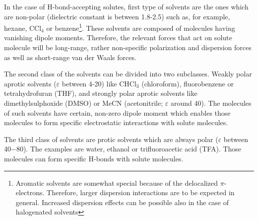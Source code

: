\documentclass[a4paper,titlepage,twoside,fleqn,12pt]{book}
\begin{document}
\begin{refsection}
In the case of H\hyp{}bond\hyp{}accepting solutes, first type of solvents are the ones
which are non\hyp{}polar (dielectric constant is between 1.8-2.5) such as, for example,
hexane, CCl$_4$ or benzene\footnote{Aromatic solvents are somewhat special because 
of the delocalized $\pi$-electrons. Therefore, larger dispersion interactions are to be expected in general.
Increased dispersion effects can be possible also in the case of halogenated solvents}. 
These solvents are composed
of molecules having vanishing dipole moments. Therefore, the relevant forces that act on
solute molecule will be long\hyp{}range, rather non\hyp{}specific polarization and dispersion
forces as well as short\hyp{}range van der Waals forces. 

The second class of the solvents can be divided into two subclasses. 
Weakly polar aprotic solvents ($\varepsilon$ between 4-20) 
like CHCl$_3$ (chloroform), fluorobenzene or tetrahydrofuran (THF), 
and strongly polar aprotic solvents like dimethylsulphoxide (DMSO) 
or MeCN (acetonitrile; $\varepsilon$ around 40).
The molecules of such solvents have certain, non-zero dipole moment 
which enables those molecules to form specific electrostatic interactions with 
solute molecules.

The third class of solvents are protic solvents which are always polar 
($\varepsilon$ between 40$-$80). The examples are water, ethanol or trifluoroacetic acid (TFA).
Those molecules can form specific H\hyp{}bonds with solute molecules. 


\end{refsection}
\end{document}

